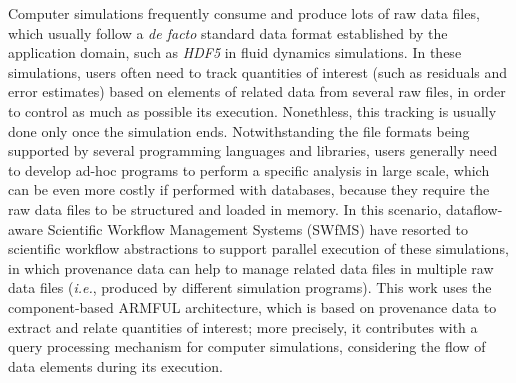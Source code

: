 \begin{foreignabstract}

Computer simulations frequently consume and produce lots of raw data files, which usually follow a \textit{de facto} standard data format established by the application domain, such as \textit{HDF5} in fluid dynamics simulations.
In these simulations, users often need to track quantities of interest (such as residuals and error estimates) based on elements of related data from several raw files, in order to control as much as possible its execution.
Nonethless, this tracking is usually done only once the simulation ends.
Notwithstanding the file formats being supported by several programming languages and libraries, users generally need to develop ad-hoc programs to perform a specific analysis in large scale, which can be even more costly if performed with databases, because they require the raw data files to be structured and loaded in memory.
In this scenario, dataflow-aware Scientific Workflow Management Systems (SWfMS) have resorted %
to scientific workflow abstractions to support parallel execution of these simulations, in which provenance data can help to manage related data files in multiple raw data files (\textit{i.e.}, produced by different simulation programs).
This work uses the component-based ARMFUL architecture, which is based on provenance data to extract and relate quantities of interest; more precisely, it contributes with a query processing mechanism for computer simulations, considering the flow of data elements during its execution.

\end{foreignabstract}
